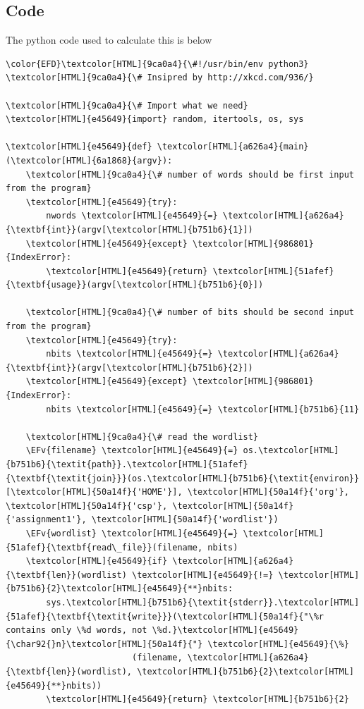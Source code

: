 \documentclass{scrartcl}
\newcommand{\EFv}[1]{\textcolor{EFv}{#1}} %
\begin{document}
\subsection{Code}
\label{sec:org992182f}
The python code used to calculate this is below
\begin{Code}
\begin{Verbatim}[]
\color{EFD}\textcolor[HTML]{9ca0a4}{\#!/usr/bin/env python3}
\textcolor[HTML]{9ca0a4}{\# Insipred by http://xkcd.com/936/}

\textcolor[HTML]{9ca0a4}{\# Import what we need}
\textcolor[HTML]{e45649}{import} random, itertools, os, sys

\textcolor[HTML]{e45649}{def} \textcolor[HTML]{a626a4}{main}(\textcolor[HTML]{6a1868}{argv}):
    \textcolor[HTML]{9ca0a4}{\# number of words should be first input from the program}
    \textcolor[HTML]{e45649}{try}:
        nwords \textcolor[HTML]{e45649}{=} \textcolor[HTML]{a626a4}{\textbf{int}}(argv[\textcolor[HTML]{b751b6}{1}])
    \textcolor[HTML]{e45649}{except} \textcolor[HTML]{986801}{IndexError}:
        \textcolor[HTML]{e45649}{return} \textcolor[HTML]{51afef}{\textbf{usage}}(argv[\textcolor[HTML]{b751b6}{0}])

    \textcolor[HTML]{9ca0a4}{\# number of bits should be second input from the program}
    \textcolor[HTML]{e45649}{try}:
        nbits \textcolor[HTML]{e45649}{=} \textcolor[HTML]{a626a4}{\textbf{int}}(argv[\textcolor[HTML]{b751b6}{2}])
    \textcolor[HTML]{e45649}{except} \textcolor[HTML]{986801}{IndexError}:
        nbits \textcolor[HTML]{e45649}{=} \textcolor[HTML]{b751b6}{11}

    \textcolor[HTML]{9ca0a4}{\# read the wordlist}
    \EFv{filename} \textcolor[HTML]{e45649}{=} os.\textcolor[HTML]{b751b6}{\textit{path}}.\textcolor[HTML]{51afef}{\textbf{\textit{join}}}(os.\textcolor[HTML]{b751b6}{\textit{environ}}[\textcolor[HTML]{50a14f}{'HOME'}], \textcolor[HTML]{50a14f}{'org'}, \textcolor[HTML]{50a14f}{'csp'}, \textcolor[HTML]{50a14f}{'assignment1'}, \textcolor[HTML]{50a14f}{'wordlist'})
    \EFv{wordlist} \textcolor[HTML]{e45649}{=} \textcolor[HTML]{51afef}{\textbf{read\_file}}(filename, nbits)
    \textcolor[HTML]{e45649}{if} \textcolor[HTML]{a626a4}{\textbf{len}}(wordlist) \textcolor[HTML]{e45649}{!=} \textcolor[HTML]{b751b6}{2}\textcolor[HTML]{e45649}{**}nbits:
        sys.\textcolor[HTML]{b751b6}{\textit{stderr}}.\textcolor[HTML]{51afef}{\textbf{\textit{write}}}(\textcolor[HTML]{50a14f}{"\%r contains only \%d words, not \%d.}\textcolor[HTML]{e45649}{\char92{}n}\textcolor[HTML]{50a14f}{"} \textcolor[HTML]{e45649}{\%}
                         (filename, \textcolor[HTML]{a626a4}{\textbf{len}}(wordlist), \textcolor[HTML]{b751b6}{2}\textcolor[HTML]{e45649}{**}nbits))
        \textcolor[HTML]{e45649}{return} \textcolor[HTML]{b751b6}{2}


\end{Verbatim}
\end{Code}
\end{document}
